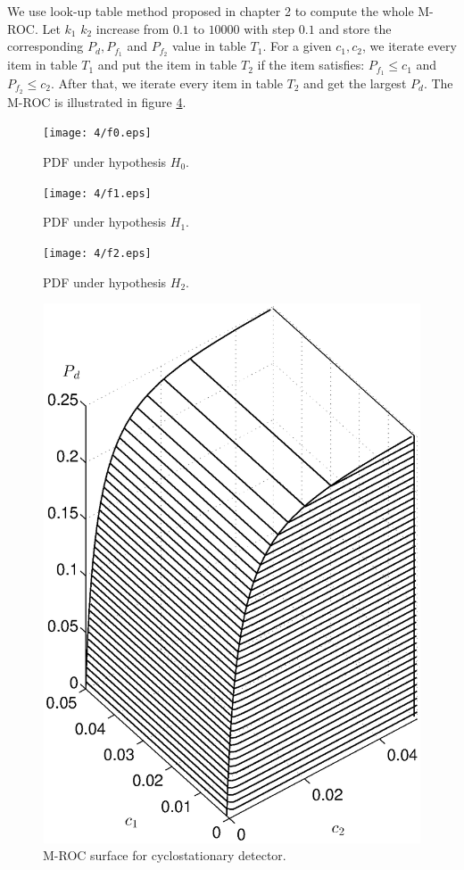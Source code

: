 We use look-up table method proposed in chapter 2 to compute the whole M-ROC.  Let $k_1$ $k_2$ increase from $0.1$ to $10000$ with step $0.1$ and store the corresponding $P_d, P_{f_1}$ and $P_{f_2}$ value in table $T_1$. For a given $c_1, c_2$, we iterate every item in table $T_1$ and put the item in table $T_2$ if the item satisfies: $P_{f_1} \leq c_1$ and $P_{f_2}\leq c_2$. After that, we iterate every item in table $T_2$ and get the largest $P_d$. The M-ROC is illustrated in figure \ref{pic:1221n0}.  

\begin{figure}[!t]
  \centering 
  \texttt{[image: 4/f0.eps]}
  \caption{PDF under hypothesis $H_0$.}
  \label{pic:1218n0}
\end{figure}
\begin{figure}[!t]
  \centering 
  \texttt{[image: 4/f1.eps]}
  \caption{PDF under hypothesis $H_1$.}
  \label{pic:1218n1}
\end{figure}
\begin{figure}[!t]
  \centering 
  \texttt{[image: 4/f2.eps]}
  \caption{PDF under hypothesis $H_2$.}
  \label{pic:1218n2}
\end{figure}

\begin{figure}[!t]
  \centering 
  \includegraphics[width=12cm, height=16cm]{4/ROCsurface.eps}
  \caption{M-ROC surface for cyclostationary detector.}
  \label{pic:1221n0}
\end{figure}
